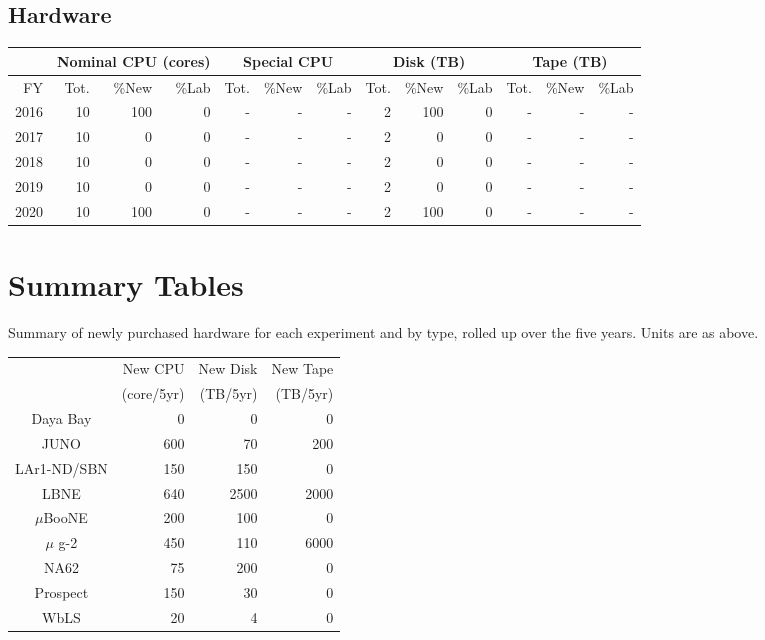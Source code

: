 \documentclass[pdftex,12pt,letter]{article}
\begin{document}
\subsection{Hardware}

\begin{tabular}[h]{|r || r|r|r || r|r|r || r|r|r || r|r|r ||}
  \hline
   & \multicolumn{3}{c||}{Nominal CPU (cores)} & \multicolumn{3}{c||}{Special CPU} & \multicolumn{3}{c||}{Disk (TB)} & \multicolumn{3}{c||}{Tape (TB)} \\
   \hline
  FY & Tot. & \%New & \%Lab & Tot. & \%New & \%Lab & Tot. & \%New & \%Lab & Tot. & \%New & \%Lab \\
  \hline
  2016 & 10 & 100& 0&- &- &- & 2& 100 & 0&- &- &- \\
  \hline
  2017 & 10&    0& 0&- &- &- & 2& 0& 0&- &- &-  \\
  \hline
  2018 & 10&    0& 0&- &- &- & 2& 0& 0&- &- &-  \\
  \hline
  2019 & 10&    0& 0&- &- &- & 2& 0& 0&- &- &-  \\
  \hline
  2020 & 10&  100& 0&- &- &- & 2& 100& 0&- &- &-  \\
  \hline
\end{tabular}

%

\pagebreak
\section{Summary Tables}

Summary of newly purchased hardware for each experiment and by type,
rolled up over the five years.
Units are as above.

\begin{center}
  
\begin{tabular}[h]{|c||r|r|r|}
\hline
    & New CPU    & New Disk & New Tape \\
    & (core/5yr) & (TB/5yr) & (TB/5yr) \\
\hline
Daya Bay & 0 & 0 & 0 \\
\hline
JUNO & 600 & 70 & 200 \\
\hline
LAr1-ND/SBN & 150 & 150 & 0 \\
\hline
LBNE & 640 & 2500 & 2000 \\
\hline
$\mu$BooNE & 200 & 100 & 0 \\
\hline
$\mu$ g-2 & 450 & 110 & 6000 \\
\hline
NA62 & 75 & 200 & 0 \\
\hline
Prospect & 150 & 30 & 0 \\
\hline
WbLS & 20 & 4 & 0 \\
\hline
\end{tabular}

\end{center}
\end{document}
